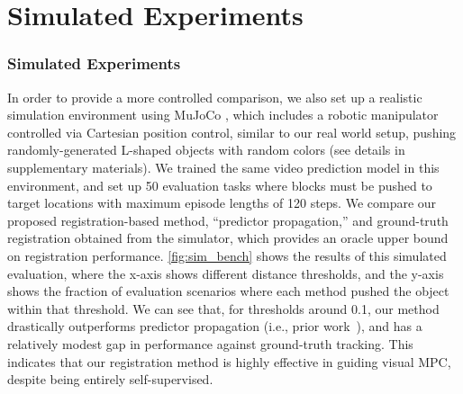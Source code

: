 \section{Simulated Experiments}

\subsubsection{Simulated Experiments}

In order to provide a more controlled comparison, we also set up a realistic simulation environment using MuJoCo \cite{todorov2012mujoco}, which includes a robotic manipulator controlled via Cartesian position control, similar to our real world setup, pushing randomly-generated L-shaped objects with random colors (see details in supplementary materials). 
We trained the same video prediction model in this environment, and set up 50 evaluation tasks where blocks must be pushed to target locations with maximum episode lengths of 120 steps. 
We  compare our proposed registration-based method, ``predictor propagation,'' and ground-truth registration obtained from the simulator, which provides an oracle upper bound on registration performance. \autoref{fig:sim_bench} shows the results of this simulated evaluation, where the x-axis shows different distance thresholds, and the y-axis shows the fraction of evaluation scenarios where each method pushed the object within that threshold. We can see that, for thresholds around 0.1, our method drastically outperforms predictor propagation (i.e., prior work~\cite{sna}), and has a relatively modest gap in performance against ground-truth tracking. This indicates that our registration method is highly effective in guiding visual MPC, despite being entirely self-supervised.





